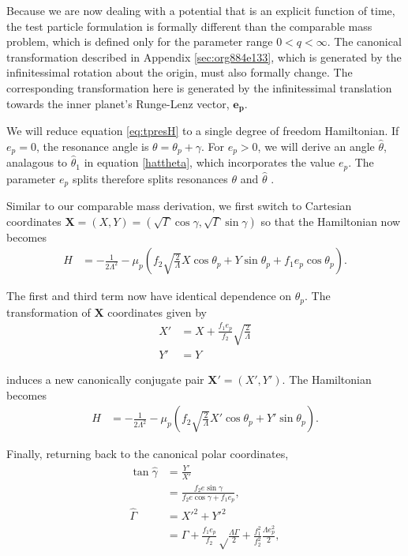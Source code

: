 \documentclass[usenatbib,twocolumn]{mnras}
\begin{document}
Because we are now dealing with a potential that is an explicit
function of time, the test particle formulation is formally different
than the comparable mass problem, which is defined only for the
parameter range \(0<q<\infty\).  The canonical transformation described
in Appendix \ref{sec:org884e133}, which is generated by the infinitessimal rotation
about the origin, must also formally change.  The corresponding
transformation here is generated by the infinitessimal translation
towards the inner planet's Runge-Lenz vector, \(\mathbf{e_p}\).

We will reduce equation \eqref{eq:tpresH} to a single
degree of freedom Hamiltonian. If \(e_p=0\), the resonance
angle is \(\theta=\theta_p+\gamma\). For \(e_p>0\), we will
derive an angle \(\hat\theta\), analagous to \(\hat\theta_1\)
in equation \eqref{hattheta}, which incorporates the value \(e_p\).
The parameter \(e_p\) splits therefore splits
resonances \(\theta\) and \(\hat\theta\)
\citep[c.f. ][]{wisdom_canonical_1986,moutamid17_deriv_captur_probab_corot_eccen}.

Similar to our comparable mass derivation,
we first switch to Cartesian coordinates
\(\mathbf X = (X,Y) = (\sqrt{\Gamma}\cos\gamma, \sqrt{\Gamma}\sin\gamma)\)
so that the Hamiltonian now becomes
\begin{align}
  H
  &= - \frac{1}{2\Lambda^2} - \mu_p\left(f_2
    \sqrt{\frac{2}{\Lambda}}X\cos\theta_p + Y\sin\theta_p + f_1 e_p\cos\theta_p\right).
\end{align}

\noindent The first and third term now have identical dependence on
\(\theta_p\).  The transformation of
\(\mathbf X\) coordinates given by
\begin{align}
  X' &= X + \frac{f_1e_p}{f_2}\sqrt{\frac{2}{\Lambda}} \\
  Y' &= Y
\end{align}

\noindent
induces a new canonically conjugate pair \(\mathbf X'=(X',Y')\).
The Hamiltonian becomes
\begin{align}
  H
  &= - \frac{1}{2\Lambda^2} - \mu_p\left(f_2
    \sqrt{\frac{2}{\Lambda}}X'\cos\theta_p + Y'\sin\theta_p \right).
\end{align}

\noindent
Finally, returning back to the canonical polar coordinates,
\begin{align}
  \tan\hat\gamma
  &= \frac{Y'}{X'} \\
  &= \frac{f_2e\sin\gamma}{f_2e\cos\gamma + f_1e_p},\label{eq:hatgtp}\\
  \hat\Gamma
  &= X'^2 + Y'^2 \\
  &= \Gamma + \frac{f_1e_p}{f_2}\sqrt\frac{\Lambda\Gamma}{2}
    + \frac{f_1^2}{f_2^2}\frac{\Lambda e_p^2}{2},\label{eq:hatGtp}\\
\end{align}
\end{document}
